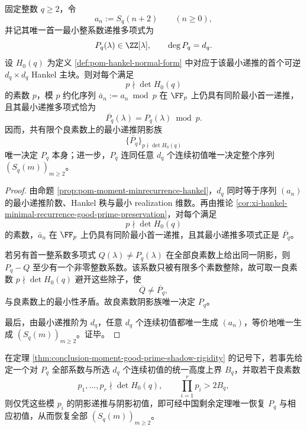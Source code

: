 \begin{theorem}[几乎所有素数阴影的刚性完备性]\label{thm:conclusion-moment-good-prime-shadow-rigidity}
固定整数 \(q\ge 2\)，令
\[
a_n:=S_q(n+2)\qquad(n\ge 0),
\]
并记其唯一首一最小整系数递推多项式为
\[
P_q(\lambda)\in \ZZ[\lambda],
\qquad
\deg P_q=d_q.
\]
设 \(H_0(q)\) 为定义 \ref{def:pom-hankel-normal-form} 中对应于该最小递推的首个可逆 \(d_q\times d_q\) Hankel 主块。则对每个满足
\[
p\nmid \det H_0(q)
\]
的素数 \(p\)，模 \(p\) 约化序列 \(\bar a_n:=a_n\bmod p\) 在 \(\FF_p\) 上仍具有同阶最小首一递推，且其最小递推多项式恰为
\[
\overline{P_q}(\lambda)=P_q(\lambda)\bmod p.
\]
因而，共有限个良素数上的最小递推阴影族
\[
\{\overline{P_q}\}_{p\nmid \det H_0(q)}
\]
唯一决定 \(P_q\) 本身；进一步，\(P_q\) 连同任意 \(d_q\) 个连续初值唯一决定整个序列 \((S_q(m))_{m\ge 2}\)。
\end{theorem}

\begin{proof}
由命题 \ref{prop:pom-moment-minrecurrence-hankel}，\(d_q\) 同时等于序列 \((a_n)\) 的最小递推阶数、Hankel 秩与最小 realization 维数。再由推论 \ref{cor:xi-hankel-minimal-recurrence-good-prime-preservation}，对每个满足
\[
p\nmid \det H_0(q)
\]
的素数，\(\bar a_n\) 在 \(\FF_p\) 上仍具有同阶最小首一递推，且其最小递推多项式正是 \(\overline{P_q}\)。

若另有首一整系数多项式 \(Q(\lambda)\neq P_q(\lambda)\) 在全部良素数上给出同一阴影，则 \(P_q-Q\) 至少有一个非零整数系数。该系数只被有限多个素数整除，故可取一良素数 \(p\nmid \det H_0(q)\) 避开这些除子，使
\[
\overline{Q}\neq \overline{P_q},
\]
与良素数上的最小性矛盾。故良素数阴影族唯一决定 \(P_q\)。

最后，由最小递推阶为 \(d_q\)，任意 \(d_q\) 个连续初值都唯一生成 \((a_n)\)，等价地唯一生成 \((S_q(m))_{m\ge 2}\)。证毕。
\end{proof}

\begin{corollary}[有限良素数即可作整数级重建]\label{cor:conclusion-moment-finite-good-primes-crt-reconstruction}
在定理 \ref{thm:conclusion-moment-good-prime-shadow-rigidity} 的记号下，若事先给定一个对 \(P_q\) 全部系数与所选 \(d_q\) 个连续初值的统一高度上界 \(B_q\)，并取若干良素数
\[
p_1,\dots,p_r\nmid \det H_0(q),
\qquad
\prod_{i=1}^{r}p_i>2B_q,
\]
则仅凭这些模 \(p_i\) 的阴影递推与阴影初值，即可经中国剩余定理唯一恢复 \(P_q\) 与相应初值，从而恢复全部 \((S_q(m))_{m\ge 2}\)。
\end{corollary}

